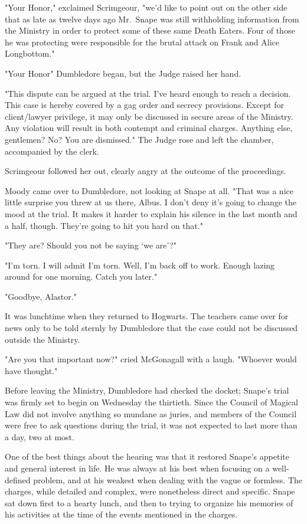 "Your Honor," exclaimed Scrimgeour, "we'd like to point out on the other side that as late as twelve days ago Mr.~Snape was still withholding information from the Ministry in order to protect some of these same Death Eaters. Four of those he was protecting were responsible for the brutal attack on Frank and Alice Longbottom."

"Your Honor{\el}" Dumbledore began, but the Judge raised her hand.

"This dispute can be argued at the trial. I've heard enough to reach a decision. This case is hereby covered by a gag order and secrecy provisions. Except for client\slash lawyer privilege, it may only be discussed in secure areas of the Ministry. Any violation will result in both contempt and criminal charges. Anything else, gentlemen? No? You are dismissed." The Judge rose and left the chamber, accompanied by the clerk.

Scrimgeour followed her out, clearly angry at the outcome of the proceedings.

Moody came over to Dumbledore, not looking at Snape at all. "That was a nice little surprise you threw at us there, Albus. I don't deny it's going to change the mood at the trial. It makes it harder to explain his silence in the last month and a half, though. They're going to hit you hard on that."

"They are? Should you not be saying `we are'?"

"I'm torn. I will admit I'm torn. Well, I'm back off to work. Enough lazing around for one morning. Catch you later."

"Goodbye, Alastor."

It was lunchtime when they returned to Hogwarts. The teachers came over for news only to be told sternly by Dumbledore that the case could not be discussed outside the Ministry.

"Are you that important now?" cried McGonagall with a laugh. "Whoever would have thought."

Before leaving the Ministry, Dumbledore had checked the docket; Snape's trial was firmly set to begin on Wednesday the thirtieth. Since the Council of Magical Law did not involve anything so mundane as juries, and members of the Council were free to ask questions during the trial, it was not expected to last more than a day, two at most.

One of the best things about the hearing was that it restored Snape's appetite and general interest in life. He was always at his best when focusing on a well-defined problem, and at his weakest when dealing with the vague or formless. The charges, while detailed and complex, were nonetheless direct and specific. Snape sat down first to a hearty lunch, and then to trying to organize his memories of his activities at the time of the events mentioned in the charges.

